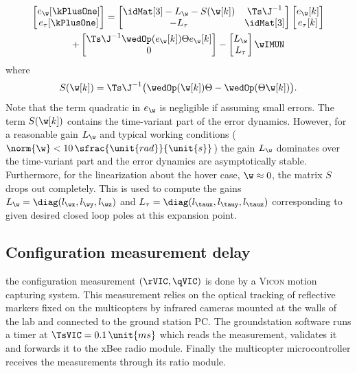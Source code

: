 \begin{multline}\label{eq:AngVelObsErrorDyn}
 \begin{bmatrix} e_{\w}[\kPlusOne] \\ e_{\tau}[\kPlusOne] \end{bmatrix} 
 = \begin{bmatrix} 
  \idMat[3] - L_{\w} - S(\w[k]) & \Ts \J^{-1} \\
  - L_{\tau} & \idMat[3]
 \end{bmatrix}
 \begin{bmatrix} e_{\w}[k] \\ e_{\tau}[k] \end{bmatrix}
\\
 +
 \begin{bmatrix} \Ts \J^{-1} \wedOp(e_{\w}[k]) \Theta e_{\w}[k] \\ 0 \end{bmatrix} 
 -
 \begin{bmatrix} L_{\w} \\ L_{\tau} \end{bmatrix} 
 \wIMUN
\end{multline}
where
\begin{align}
 S(\w[k]) = \Ts \J^{-1} \big( \wedOp(\w[k]) \Theta - \wedOp(\Theta \w[k]) \big).
\end{align}
Note that the term quadratic in $e_{\w}$ is negligible if assuming small errors.
The term $S(\w[k])$ contains the time-variant part of the error dynamics.
However, for a reasonable gain $L_{\w}$ and typical working conditions (\eg $\norm{\w} < 10\,\sfrac{\unit{rad}}{\unit{s}}$) the gain $L_{\w}$ dominates over the time-variant part and the error dynamics are asymptotically stable.
Furthermore, for the linearization about the hover case, $\w \approx 0$, the matrix $S$ drops out completely.
This is used to compute the gains $L_{\w} = \diag(l_{\wx}, l_{\wy}, l_{\wz})$ and $L_{\tau} = \diag(l_{\taux}, l_{\tauy}, l_{\tauz})$ corresponding to given desired closed loop poles at this expansion point.


\subsection{Configuration measurement delay}
the configuration measurement $(\rVIC, \qVIC)$ is done by a \textsc{Vicon} motion capturing system.
This measurement relies on the optical tracking of reflective markers fixed on the multicopters by infrared cameras mounted at the walls of the lab and connected to the ground station PC.
The groundstation software runs a timer at $\TsVIC = 0.1\,\unit{ms}$ which reads the measurement, validates it and forwards it to the xBee radio module.
Finally the multicopter microcontroller receives the measurements through its ratio module.

